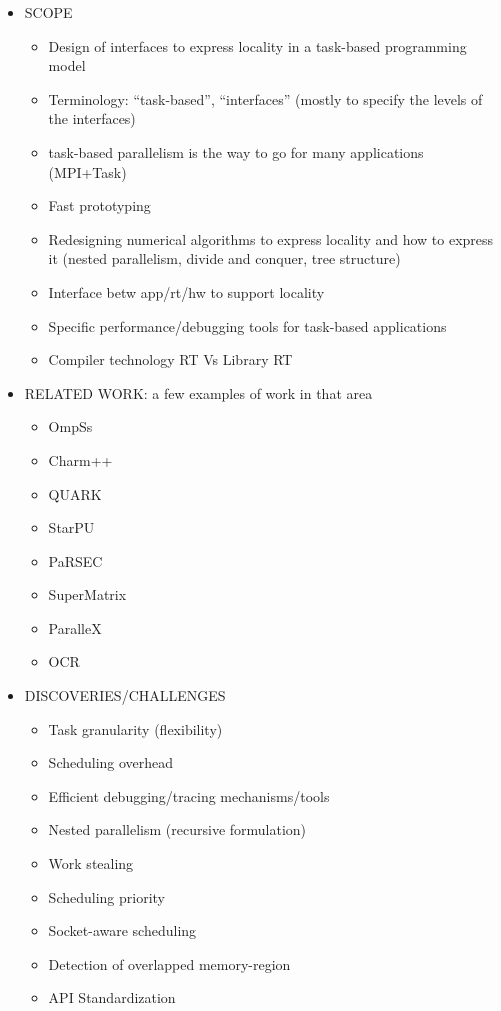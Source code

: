 \begin{itemize}
	
	
	\item SCOPE
	\begin{itemize}
		\item Design of interfaces to express
		      locality in a task-based programming model
		\item Terminology: ``task-based'', ``interfaces'' (mostly to specify the levels of the interfaces)
		\item task-based parallelism is the way to go for many applications (MPI+Task)
		\item Fast prototyping
		\item Redesigning numerical algorithms to express locality 
		and how to express it (nested parallelism, divide and conquer, tree structure)
		\item Interface betw app/rt/hw to support locality
		\item Specific performance/debugging tools for task-based applications
		\item Compiler technology RT Vs Library RT
	\end{itemize}
	
	
	
	\item RELATED WORK: a few examples of work in that area 
	\begin{itemize}
		\item OmpSs
		\item Charm++
		\item QUARK
		\item StarPU
		\item PaRSEC
		\item SuperMatrix
		\item ParalleX
		\item OCR
	\end{itemize}



	\item DISCOVERIES/CHALLENGES
	\begin{itemize}
		\item Task granularity (flexibility)
		\item Scheduling overhead
		\item Efficient debugging/tracing mechanisms/tools
		\item Nested parallelism (recursive formulation)
		\item Work stealing
		\item Scheduling priority
		\item Socket-aware scheduling
		\item Detection of overlapped memory-region
		\item API Standardization
	\end{itemize}
			

\end{itemize}
